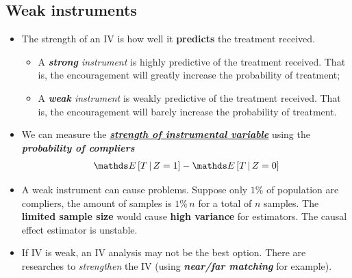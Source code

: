\documentclass[11pt]{article}
\begin{document}
\subsection{Weak instruments}
\begin{itemize}
\item The strength of an IV is how well it \textbf{predicts} the treatment received.
\begin{itemize}
\item A \emph{\textbf{strong} instrument} is highly predictive of the treatment received. That is, the encouragement will greatly increase the probability of treatment;
\item A \emph{\textbf{weak} instrument} is weakly predictive of the treatment received. That is, the encouragement will barely increase the probability of treatment.
\end{itemize}

\item We can measure the \underline{\emph{\textbf{strength of instrumental variable}}} using the \textbf{\emph{probability of compliers}} 
\begin{align}
\E{}{T\,|\,Z=1} - \E{}{T\,|\,Z=0} \label{eqn: strength_iv}
\end{align}

\item A weak instrument can cause problems.  Suppose only $1\%$ of population are compliers, the amount of samples is $1\%\,n$ for a total of $n$ samples. The \textbf{limited sample size} would cause \textbf{high variance} for estimators. The causal effect estimator is unstable. 

\item If IV is weak, an IV analysis may not be the best option. There are researches to \textit{strengthen} the IV (using \emph{\textbf{near/far matching}} for example).
\end{itemize}

\newpage


\end{document}

